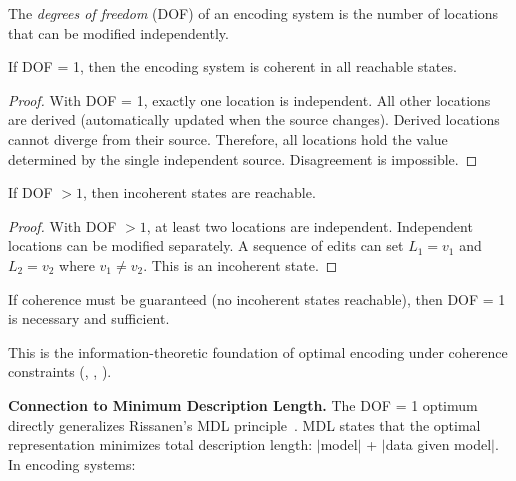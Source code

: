 \begin{definition}\label{def:dof-epistemic}
The \emph{degrees of freedom} (DOF) of an encoding system is the number of locations that can be modified independently.
\end{definition}

\begin{theorem}[DOF = 1 Guarantees Coherence]\label{thm:dof-one-coherence}
If DOF = 1, then the encoding system is coherent in all reachable states.
\end{theorem}

\begin{proof}
With DOF = 1, exactly one location is independent. All other locations are derived (automatically updated when the source changes). Derived locations cannot diverge from their source. Therefore, all locations hold the value determined by the single independent source. Disagreement is impossible.
\end{proof}

\begin{theorem}\label{thm:dof-gt-one-incoherence}
If DOF $> 1$, then incoherent states are reachable.
\end{theorem}

\begin{proof}
With DOF $> 1$, at least two locations are independent. Independent locations can be modified separately. A sequence of edits can set $L_1 = v_1$ and $L_2 = v_2$ where $v_1 \neq v_2$. This is an incoherent state.
\end{proof}

\begin{corollary}[Coherence Forces DOF = 1]\label{cor:coherence-forces-ssot}
If coherence must be guaranteed (no incoherent states reachable), then DOF = 1 is necessary and sufficient.
\end{corollary}

This is the information-theoretic foundation of optimal encoding under coherence constraints (, , ).

\textbf{Connection to Minimum Description Length.} The DOF = 1 optimum directly generalizes Rissanen's MDL principle~\cite{rissanen1978mdl}. MDL states that the optimal representation minimizes total description length: $|$model$|$ + $|$data given model$|$. In encoding systems:

